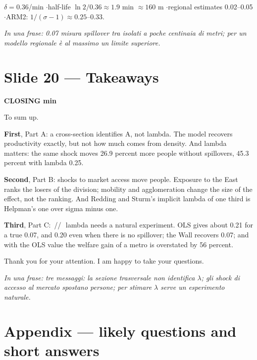 \documentclass[11pt,a4paper]{article}
\newcommand{\slide}[3]{\Needspace{14\baselineskip}\section{#1}\textcolor{unicared}{\small\bfseries\MakeUppercase{#3}\quad\textperiodcentered\quad #2}\par}
\newcommand{\idea}[1]{\par{\small\itshape\color{unicablue}In una frase: #1}\par}
\newcommand{\pause}{\textcolor{unicared}{\,/\!/\,}}
\begin{document}
\begin{nums}
$\delta = 0.36$/min \quad$\cdot$\quad half-life $\ln 2/0.36 \approx 1.9$ min $\approx 160$ m \quad$\cdot$\quad regional estimates 0.02--0.05 \quad$\cdot$\quad ARM2: $1/(\sigma-1) \approx 0.25$--$0.33$.
\end{nums}
\idea{0.07 misura spillover tra isolati a poche centinaia di metri; per un modello regionale è al massimo un limite superiore.}

\slide{Slide 20 --- Takeaways}{1 min}{Closing}

\begin{say}
To sum up.

\textbf{First}, Part A: a cross-section identifies A, not lambda. The model recovers productivity exactly, but not how much comes from density. And lambda matters: the same shock moves 26.9 percent more people without spillovers, 45.3 percent with lambda 0.25.

\textbf{Second}, Part B: shocks to market access move people. Exposure to the East ranks the losers of the division; mobility and agglomeration change the size of the effect, not the ranking. And Redding and Sturm's implicit lambda of one third is Helpman's one over sigma minus one.

\textbf{Third}, Part C: \pause\ lambda needs a natural experiment. OLS gives about 0.21 for a true 0.07, and 0.20 even when there is no spillover; the Wall recovers 0.07; and with the OLS value the welfare gain of a metro is overstated by 56 percent.

Thank you for your attention. I am happy to take your questions.
\end{say}

\idea{tre messaggi: la sezione trasversale non identifica $\lambda$; gli shock di accesso al mercato spostano persone; per stimare $\lambda$ serve un esperimento naturale.}

\newpage
\section{Appendix --- likely questions and short answers}
\end{document}
